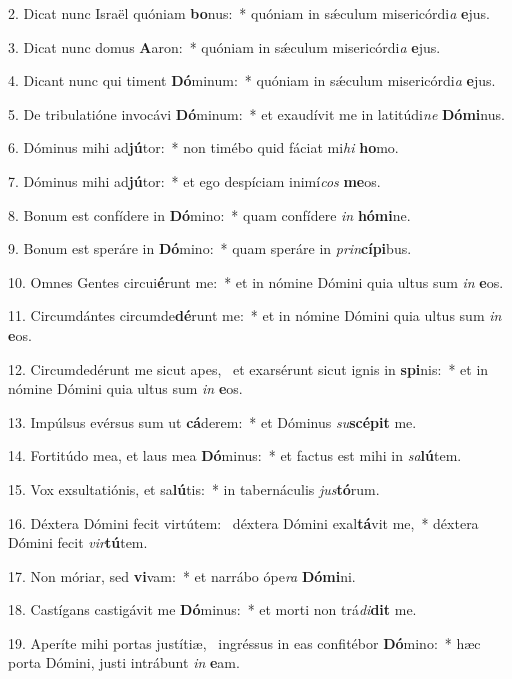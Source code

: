 2. Dicat nunc Israël quóniam \textbf{bo}nus:~*  quóniam in sǽculum misericórdi\textit{a} \textbf{e}jus.\

3. Dicat nunc domus \textbf{A}aron:~*  quóniam in sǽculum misericórdi\textit{a} \textbf{e}jus.\

4. Dicant nunc qui timent \textbf{Dó}minum:~*  quóniam in sǽculum misericórdi\textit{a} \textbf{e}jus.\

5. De tribulatióne invocávi \textbf{Dó}minum:~*  et exaudívit me in latitúdi\textit{ne} \textbf{Dó}\textbf{mi}nus.\

6. Dóminus mihi ad\textbf{jú}tor:~*  non timébo quid fáciat mi\textit{hi} \textbf{ho}mo.\

7. Dóminus mihi ad\textbf{jú}tor:~*  et ego despíciam inimí\textit{cos} \textbf{me}os.\

8. Bonum est confídere in \textbf{Dó}mino:~*  quam confídere \textit{in} \textbf{hó}\textbf{mi}ne.\

9. Bonum est speráre in \textbf{Dó}mino:~*  quam speráre in \textit{prin}\textbf{cí}\textbf{pi}bus.\

10. Omnes Gentes circui\textbf{é}runt me:~*  et in nómine Dómini quia ultus sum \textit{in} \textbf{e}os.\

11. Circumdántes circumde\textbf{dé}runt me:~*  et in nómine Dómini quia ultus sum \textit{in} \textbf{e}os.\

12. Circumdedérunt me sicut apes, \dag\  et exarsérunt sicut ignis in \textbf{spi}nis:~*  et in nómine Dómini quia ultus sum \textit{in} \textbf{e}os.\

13. Impúlsus evérsus sum ut \textbf{cá}derem:~*  et Dóminus \textit{su}\textbf{scé}\textbf{pit} me.\

14. Fortitúdo mea, et laus mea \textbf{Dó}minus:~*  et factus est mihi in \textit{sa}\textbf{lú}tem.\

15. Vox exsultatiónis, et sa\textbf{lú}tis:~*  in tabernáculis \textit{jus}\textbf{tó}rum.\

16. Déxtera Dómini fecit virtútem: \dag\  déxtera Dómini exal\textbf{tá}vit me,~*  déxtera Dómini fecit \textit{vir}\textbf{tú}tem.\

17. Non móriar, sed \textbf{vi}vam:~*  et narrábo ópe\textit{ra} \textbf{Dó}\textbf{mi}ni.\

18. Castígans castigávit me \textbf{Dó}minus:~*  et morti non trá\textit{di}\textbf{dit} me.\

19. Aperíte mihi portas justítiæ, \dag\  ingréssus in eas confitébor \textbf{Dó}mino:~*  hæc porta Dómini, justi intrábunt \textit{in} \textbf{e}am.\

